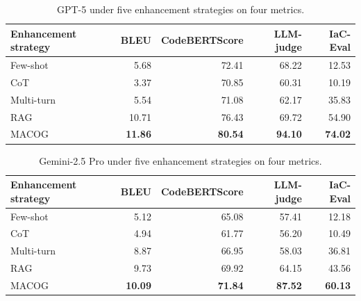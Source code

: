\documentclass[manuscript,screen,nonacm]{acmart}
\begin{document}
\begin{table}[t]
\centering
\caption{GPT-5 under five enhancement strategies on four metrics.}
\label{tab:gpt5_metrics}
\small
\setlength{\tabcolsep}{6pt}
\begin{tabular}{@{}lrrrr@{}}
\toprule
\textbf{Enhancement strategy} & \textbf{BLEU} & \textbf{CodeBERTScore} & \textbf{LLM-judge} & \textbf{IaC-Eval} \\
\midrule
Few-shot     & 5.68  & 72.41 & 68.22 & 12.53 \\
CoT          & 3.37  & 70.85 & 60.31 & 10.19 \\
Multi-turn   & 5.54  & 71.08 & 62.17 & 35.83 \\
RAG          & 10.71 & 76.43 & 69.72 & 54.90 \\
MACOG        & \textbf{11.86} & \textbf{80.54} & \textbf{94.10} & \textbf{74.02} \\
\bottomrule
\end{tabular}
\end{table}


\begin{table}[t]
\centering
\caption{Gemini-2.5 Pro under five enhancement strategies on four metrics.}
\label{tab:gemini25_metrics}
\small
\setlength{\tabcolsep}{6pt}
\begin{tabular}{@{}lrrrr@{}}
\toprule
\textbf{Enhancement strategy} & \textbf{BLEU} & \textbf{CodeBERTScore} & \textbf{LLM-judge} & \textbf{IaC-Eval} \\
\midrule
Few-shot     & 5.12  & 65.08 & 57.41 & 12.18 \\
CoT          & 4.94  & 61.77 & 56.20 & 10.49 \\
Multi-turn   & 8.87  & 66.95 & 58.03 & 36.81 \\
RAG          & 9.73  & 69.92 & 64.15 & 43.56 \\
MACOG        & \textbf{10.09} & \textbf{71.84} & \textbf{87.52} & \textbf{60.13} \\
\bottomrule
\end{tabular}
\end{table}
\end{document}
